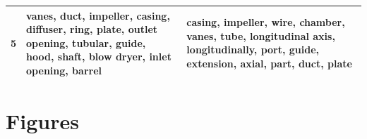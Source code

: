 \begin{table}[htbp]
\begin{tabular}{|r|p{16em}|p{18em}|}
    \midrule
    5 & \textbf{vanes}, \textbf{duct}, \textbf{impeller}, \textbf{casing}, diffuser, ring, \textbf{plate}, outlet opening, tubular, guide, hood, shaft, blow dryer, inlet opening, barrel & \textbf{casing}, \textbf{impeller}, wire, chamber, \textbf{vanes}, tube, longitudinal axis, longitudinally, port, guide, extension, axial, part, \textbf{duct}, \textbf{plate} \\
    \bottomrule
    \end{tabular}%
  \label{tab:addlabel}%
\end{table}%

\section{Figures}

